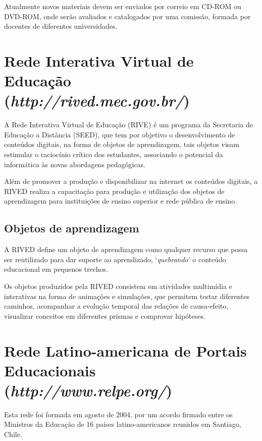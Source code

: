 \documentclass[a4paper,12pt]{report}
\begin{document}
        Atualmente novos materiais devem ser enviados por correio em CD-ROM ou
        DVD-ROM, onde serão avaliados e catalogados por uma comissão, formada
        por docentes de diferentes universidades.

        \section{Rede Interativa Virtual de Educação
                \\(\emph{http://rived.mec.gov.br/})}
        A Rede Interativa Virtual de Educação (RIVE) é um programa da Secretaria
        de Educação a Distância (SEED), que tem por objetivo o desenvolvimento
        de conteúdos digitais, na forma de objetos de aprendizagem, tais objetos
        visam estimular o raciocínio crítico dos estudantes, associando o
        potencial da informática às novas abordagens pedagógicas.

        Além de promover a produção e disponibilizar na internet os conteúdos
        digitais, a RIVED realiza a capacitação para produção e utilização dos
        objetos de aprendizagem para instituições de ensino superior e rede
        pública de ensino.

            \subsection{Objetos de aprendizagem}
            A RIVED define um objeto de aprendizagem como qualquer recurso que
            possa ser reutilizado para dar suporte ao aprendizado,
            `\emph{quebrando}' o conteúdo educacional em pequenos trechos.

            Os objetos produzidos pela RIVED consistem em atividades multimídia
            e interativas na forma de animações e simulações, que permitem
            testar diferentes caminhos, acompanhar a evolução temporal das
            relações de causa-efeito, visualizar conceitos em diferentes prismas
            e comprovar hipóteses.

        \section{Rede Latino-americana de Portais Educacionais
                \\(\emph{http://www.relpe.org/})}
        Esta rede foi formada em agosto de 2004, por um acordo firmado entre os
        Ministros da Educação de 16 países latino-americanos reunidos em
        Santiago, Chile.
\end{document}
